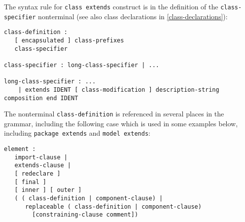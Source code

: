 The syntax rule for \lstinline!class extends! construct is in the definition of the
\lstinline!class-specifier! nonterminal (see also class declarations in \autoref{class-declarations}):
\begin{lstlisting}[language=grammar]
class-definition :
   [ encapsulated ] class-prefixes
   class-specifier

class-specifier : long-class-specifier | ...

long-class-specifier : ...
    | extends IDENT [ class-modification ] description-string composition end IDENT
\end{lstlisting}
The nonterminal \lstinline!class-definition! is referenced in several places in the
grammar, including the following case which is used in some examples
below, including \lstinline!package extends! and \lstinline!model extends!:
\begin{lstlisting}[language=grammar]
element :
   import-clause |
   extends-clause |
   [ redeclare ]
   [ final ]
   [ inner ] [ outer ]
   ( ( class-definition | component-clause) |
      replaceable ( class-definition | component-clause)
        [constraining-clause comment])
\end{lstlisting}

